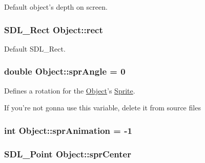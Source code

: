 Default object's depth on screen. 

\hypertarget{class_object_ac2bf39eb033cf8c8fc9220d607842dbe}{
\subsubsection[{rect}]{\setlength{\rightskip}{0pt plus 5cm}S\-D\-L\-\_\-\-Rect Object\-::rect\hspace{0.3cm}{\ttfamily [protected]}}}\label{class_object_ac2bf39eb033cf8c8fc9220d607842dbe}


Default S\-D\-L\-\_\-\-Rect. 

\hypertarget{class_object_a5e5f645424be8ec1ce1cf9dd858e939a}{
\subsubsection[{spr\-Angle}]{\setlength{\rightskip}{0pt plus 5cm}double Object\-::spr\-Angle = 0\hspace{0.3cm}{\ttfamily [protected]}}}\label{class_object_a5e5f645424be8ec1ce1cf9dd858e939a}


Defines a rotation for the \hyperlink{class_object}{Object}'s \hyperlink{class_sprite}{Sprite}. 

If you're not gonna use this variable, delete it from source files \hypertarget{class_object_a72bd9c2d466c47f6cd8df5e38185d432}{
\subsubsection[{spr\-Animation}]{\setlength{\rightskip}{0pt plus 5cm}int Object\-::spr\-Animation = -\/1\hspace{0.3cm}{\ttfamily [protected]}}}\label{class_object_a72bd9c2d466c47f6cd8df5e38185d432}
\hypertarget{class_object_ab5d3b1e8dbb35e139a3fd3a3b28b8610}{
\subsubsection[{spr\-Center}]{\setlength{\rightskip}{0pt plus 5cm}S\-D\-L\-\_\-\-Point Object\-::spr\-Center\hspace{0.3cm}{\ttfamily [protected]}}}\label{class_object_ab5d3b1e8dbb35e139a3fd3a3b28b8610}


